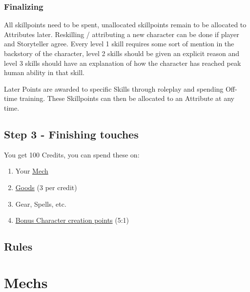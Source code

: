 \documentclass[a4paper]{book}
\begin{document}
    \subsection{Finalizing}\label{subsec:finalizing}
    All skillpoints need to be spent, unallocated skillpoints remain to be allocated to Attributes later.
    Reskilling / attributing a new character can be done if player and Storyteller agree.
    Every level 1 skill requires some sort of mention in the backstory of the character, level 2 skills should be given
    an explicit reason and level 3 skills should have an explanation of how the character has reached peak human ability
    in that skill.

    Later Points are awarded to specific Skills through roleplay and spending Off-time training.
    These Skillpoints can then be allocated to an Attribute at any time.

    \section{Step 3 - Finishing touches}\label{sec:step3-finishingtouches}
    You get 100 Credits, you can spend these on:
    \begin{enumerate}[label = -]
        \item Your \hyperref[ch:mechs]{Mech}
        \item \hyperref[sec:tradegoods]{Goods} (3 per credit)
        \item Gear, Spells, etc.
        \item \hyperref[sec:step2-scores]{Bonus Character creation points} (5:1)
    \end{enumerate}


    \section{Rules}\label{sec:rules}
    


    \chapter{Mechs}\label{ch:mechs}
    
\end{document}
